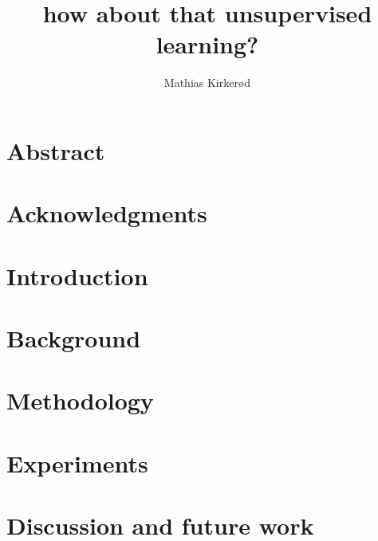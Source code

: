 \documentclass[UKenglish]{ifimaster}
\title{how about that unsupervised learning?}
\author{Mathias Kirker{\o}d}
\begin{document}
\setcounter{hyp}{-1}
\duoforside[dept={Department of Informatics},program={Informatics: Technical and Scientific Applications},long]

\frontmatter{}
\chapter*{Abstract}


\chapter*{Acknowledgments}


\tableofcontents{}
\listoffigures{}
\listoftables{}


\mainmatter{}


\chapter{Introduction} \label{cap:introduction}


\chapter{Background} \label{cap:background}



\chapter{Methodology}\label{cap:methodology}



%

\chapter{Experiments} \label{cap:experiments}



\chapter{Discussion and future work} \label{cap:future}

\end{document}
